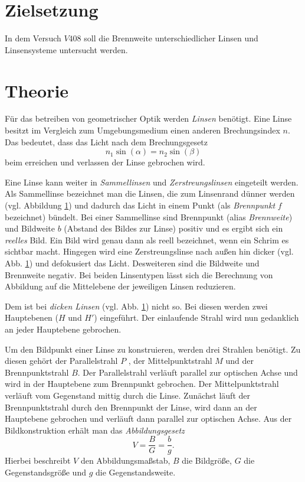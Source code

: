\setcounter{page}{1}
\section*{Zielsetzung}
In dem Versuch $V408$ soll die Brennweite unterschiedlicher Linsen und
Linsensysteme untersucht werden.
\section{Theorie}
Für das betreiben von geometrischer Optik werden \emph{Linsen} benötigt.
Eine Linse besitzt im Vergleich zum Umgebungsmedium einen anderen Brechungsindex $n$.
Das bedeutet, dass das Licht nach dem Brechungsgesetz
\begin{equation*}
  n_1\sin(\alpha)=n_2\sin(\beta)
\end{equation*}
beim erreichen und verlassen der Linse gebrochen wird.

Eine Linse kann weiter in \emph{Sammellinsen} und \emph{Zerstreungslinsen}
eingeteilt werden. Als Sammellinse bezeichnet man die Linsen, die zum Linsenrand
dünner werden (vgl. Abbildung \ref{}) und dadurch das Licht in einem Punkt (als \emph{Brennpunkt} $f$ bezeichnet)
bündelt.
Bei einer Sammellinse sind Brennpunkt (alias \emph{Brennweite})
und Bildweite $b$ (Abstand des Bildes zur Linse) positiv und es ergibt sich ein
\emph{reelles} Bild. Ein Bild wird genau dann als reell bezeichnet, wenn
 ein Schrim es sichtbar macht.
Hingegen wird eine Zerstreungslinse nach außen hin dicker (vgl. Abb. \ref{}) und
defokusiert das Licht. Desweiteren sind die Bildweite und Brennweite negativ.
Bei beiden Linsentypen lässt sich die Berechnung von Abbildung auf die Mittelebene
der jeweiligen Linsen reduzieren.

Dem ist bei \emph{dicken Linsen} (vgl. Abb. \ref{}) nicht so.
Bei diesen werden zwei Hauptebenen ($H$ und $H'$) eingeführt. Der einlaufende Strahl
wird nun gedanklich an jeder Hauptebene gebrochen.

Um den Bildpunkt einer Linse zu konstruieren, werden drei Strahlen benötigt.
Zu diesen gehört der Parallelstrahl $P$ , der Mittelpunktstrahl $M$ und der
Brennpunktstrahl $B$.
Der Parallelstrahl verläuft parallel zur optischen Achse und wird in der Hauptebene
zum Brennpunkt gebrochen. Der Mittelpunktstrahl verläuft vom Gegenstand mittig durch die
Linse. Zunächst läuft der Brennpunktstrahl durch den Brennpunkt der Linse, wird dann
an der Hauptebene gebrochen und verläuft dann parallel zur optischen Achse.
Aus der Bildkonstruktion erhält man das \emph{Abbildungsgesetz}
\begin{equation}
  \label{eq: abbildungsgesetz}
  V=\frac{B}{G}=\frac{b}{g}.
\end{equation}
Hierbei beschreibt $V$ den Abbildungsmaßstab, $B$ die Bildgröße, $G$ die Gegenstandsgröße
und $g$ die Gegenstandsweite.

